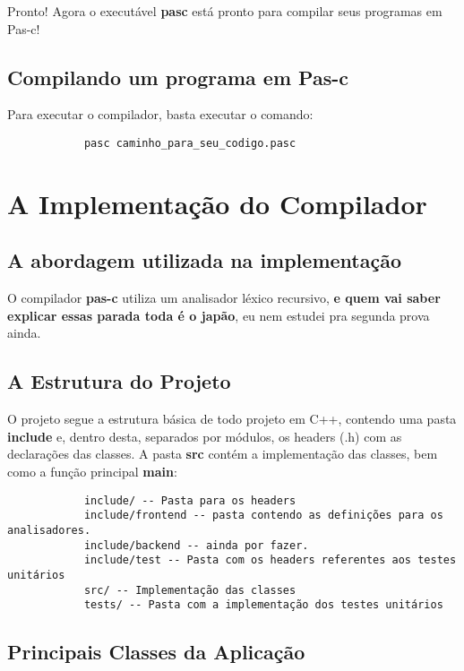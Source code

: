 \documentclass[11pt]{article}
\begin{document}
		Pronto! Agora o executável \textbf{pasc} está pronto para compilar seus programas em Pas-c!
	
	
	\subsection{Compilando um programa em Pas-c}
	
		Para executar o compilador, basta executar o comando:
		
		\begin{verbatim}
			pasc caminho_para_seu_codigo.pasc
		\end{verbatim}
	

\newpage
\section{A Implementação do Compilador}
	
	\subsection{A abordagem utilizada na implementação}
		
		O compilador \textbf{pas-c} utiliza um analisador léxico recursivo, \textbf{e quem vai saber explicar essas parada toda é o japão}, eu nem estudei pra segunda prova ainda. 
		
	\subsection{A Estrutura do Projeto}
		
		O projeto segue a estrutura básica de todo projeto em C++, contendo uma pasta \textbf{include} e, dentro desta, separados por módulos, os headers (.h) com as declarações das classes. A pasta \textbf{src} contém a implementação das classes, bem como a função principal \textbf{main}:
		
		\begin{verbatim}
			include/ -- Pasta para os headers
			include/frontend -- pasta contendo as definições para os analisadores.
			include/backend -- ainda por fazer.
			include/test -- Pasta com os headers referentes aos testes unitários
			src/ -- Implementação das classes
			tests/ -- Pasta com a implementação dos testes unitários 
		\end{verbatim}
		
		
		
	\subsection{Principais Classes da Aplicação}
		
\end{document}
